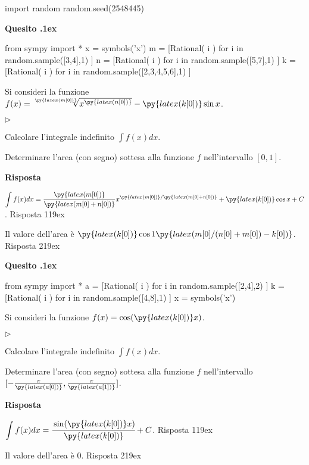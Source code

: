 \documentclass[11pt,twoside,a4paper]{article}
\newcommand{\mylabel}[1]{#1\hfill}
\renewenvironment{itemize}
  {\begin{list}{$\triangleright$}{%
   \setlength{\parskip}{0mm}
   \setlength{\topsep}{.4\baselineskip}
   \setlength{\rightmargin}{0mm}
   \setlength{\listparindent}{0mm}
   \setlength{\itemindent}{0mm}
   \setlength{\labelwidth}{2ex}
   \setlength{\itemsep}{.4\baselineskip}
   \setlength{\parsep}{0mm}
   \setlength{\partopsep}{0mm}
   \setlength{\labelsep}{1ex}
   \setlength{\leftmargin}{\labelwidth+\labelsep}
   \let\makelabel\mylabel}}{%
   \end{list}\vspace*{-1.3mm}}
\newcounter{quesito}
\newenvironment{question}{\bigskip\addtocounter{quesito}{1}\bigskip\bigskip\par\textbf{Quesito \thequesito.\kern1ex}}{\vspace{\parskip}}
\newenvironment{answer}{\par\textbf{Risposta\quad}}{\vspace{\parskip}}
\begin{document}
\begin{pycode}
import random
random.seed(2548445)
\end{pycode}
\begin{question}
\begin{pycode}
from sympy import *
x = symbols('x')
m = [Rational( i ) for i in random.sample([3,4],1) ]
n = [Rational( i ) for i in random.sample([5,7],1) ]
k = [Rational( i ) for i in random.sample([2,3,4,5,6],1) ]
\end{pycode}
Si consideri la funzione $f(x) = \sqrt[\py{latex(m[0])}]{x^{\py{latex(n[0])}}} - \py{latex(k[0])}\sin x$.
\begin{itemize}
\item[1.] Calcolare l'integrale indefinito $\displaystyle \int f(x) dx$.
\item[2.] Determinare l'area (con segno) sottesa alla funzione $f$ nell'intervallo $[0,1]$.
\end{itemize}
\begin{answer}

{\color{blue}
$\displaystyle \int f(x) dx = \frac{\py{latex(m[0])}}{\py{latex(m[0]+n[0])}}x^{\py{latex(m[0])}/\py{latex(m[0]+n[0])}} + \py{latex(k[0])}\cos x + C$.
\hfill Risposta 1\kern19ex}

\smallskip
{\color{blue} Il valore dell'area è
$\py{latex(k[0])}\cos 1 \py{latex(m[0]/(n[0]+m[0])-k[0])}$.
\hfill Risposta 2\kern19ex}

\end{answer}
\end{question}
\begin{question}
\begin{pycode}
from sympy import *
a = [Rational( i ) for i in random.sample([2,4],2) ]
k = [Rational( i ) for i in random.sample([4,8],1) ]
x = symbols('x')
\end{pycode}
Si consideri la funzione $f(x) = \cos(\py{latex(k[0])}x)$.
\begin{itemize}
\item[1.] Calcolare l'integrale indefinito $\displaystyle \int f(x) dx$.
\item[2.] Determinare l'area (con segno) sottesa alla funzione $f$ nell'intervallo $[-\frac{\pi}{\py{latex(a[0])}},\frac{\pi}{\py{latex(a[1])}}]$.
\end{itemize}
\begin{answer}

{\color{blue}
$\displaystyle \int f(x) dx = \cfrac{\sin(\py{latex(k[0])}x)}{\py{latex(k[0])}} + C$.
\hfill Risposta 1\kern19ex}

\smallskip
{\color{blue} Il valore dell'area è 0.
\hfill Risposta 2\kern19ex}

\end{answer}
\end{question}
\end{document}
